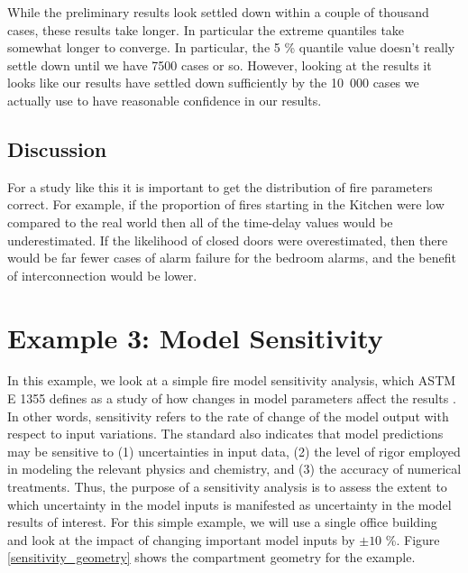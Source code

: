 \documentclass[12pt,twoside]{book}
\begin{document}
While the preliminary results look settled down within a couple of thousand cases, these results take longer. In particular the extreme quantiles take somewhat longer to converge. In particular, the 5 \% quantile value doesn't really settle down until we have 7500 cases or so. However, looking at the results it looks like our results have settled down sufficiently by the 10~000 cases we actually use to have reasonable confidence in our results.

\hypertarget{discussion}{%
\subsection{Discussion}\label{discussion}}

For a study like this it is important to get the distribution of fire parameters correct. For example, if the proportion of fires starting in the Kitchen were low compared to the real world then all of the time-delay values would be underestimated. If the likelihood of closed doors were overestimated, then there would be far fewer cases of alarm failure for the bedroom alarms, and the benefit of interconnection would be lower.

%
%

\section{Example 3: Model Sensitivity}
\label{chapter:Sensitivity}

In this example, we look at a simple fire model sensitivity analysis, which ASTM E 1355 defines as a study of how changes in model parameters affect the results \cite{CFAST:ASTM:E1355}. In other words, sensitivity refers to the rate of change of the model output with respect to input variations. The standard also indicates that model predictions may be sensitive to (1) uncertainties in input data, (2) the level of rigor employed in modeling the relevant physics and chemistry, and (3) the accuracy of numerical treatments. Thus, the purpose of a sensitivity analysis is to assess the extent to which uncertainty in the model inputs is manifested as uncertainty in the model results of interest. For this simple example, we will use a single office building and look at the impact of changing important model inputs by $\pm 10$ \%. Figure \ref{sensitivity_geometry} shows the compartment geometry for the example.
\end{document}
